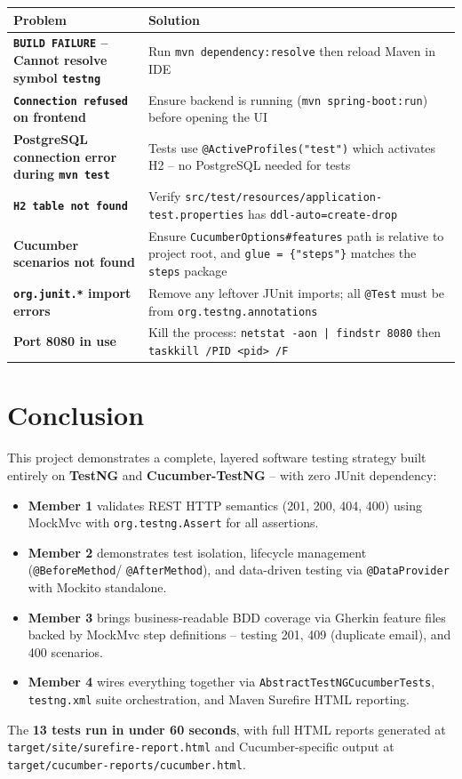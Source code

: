 \documentclass[12pt,a4paper]{article}
\begin{document}
\begin{tabularx}{\textwidth}{>{\bfseries}lX}
\toprule
Problem & Solution \\
\midrule
\texttt{BUILD FAILURE} -- Cannot resolve symbol \texttt{testng}
  & Run \texttt{mvn dependency:resolve} then reload Maven in IDE \\
\addlinespace
\texttt{Connection refused} on frontend
  & Ensure backend is running (\texttt{mvn spring-boot:run}) before opening the UI \\
\addlinespace
PostgreSQL connection error during \texttt{mvn test}
  & Tests use \texttt{@ActiveProfiles("test")} which activates H2 -- no PostgreSQL needed for tests \\
\addlinespace
\texttt{H2 table not found}
  & Verify \texttt{src/test/resources/application-test.properties} has \texttt{ddl-auto=create-drop} \\
\addlinespace
Cucumber scenarios not found
  & Ensure \texttt{CucumberOptions\#features} path is relative to project root,
    and \texttt{glue = \{"steps"\}} matches the \texttt{steps} package \\
\addlinespace
\texttt{org.junit.*} import errors
  & Remove any leftover JUnit imports; all \texttt{@Test} must be from \texttt{org.testng.annotations} \\
\addlinespace
Port 8080 in use
  & Kill the process: \texttt{netstat -aon | findstr 8080} then \texttt{taskkill /PID <pid> /F} \\
\bottomrule
\end{tabularx}

\section{Conclusion}

This project demonstrates a complete, layered software testing strategy built entirely
on \textbf{TestNG} and \textbf{Cucumber-TestNG} -- with zero JUnit dependency:

\begin{itemize}[noitemsep]
  \item \textbf{Member 1} validates REST HTTP semantics (201, 200, 404, 400) using MockMvc with
        \texttt{org.testng.Assert} for all assertions.
  \item \textbf{Member 2} demonstrates test isolation, lifecycle management (\texttt{@BeforeMethod}/
        \texttt{@AfterMethod}), and data-driven testing via \texttt{@DataProvider} with Mockito
        standalone.
  \item \textbf{Member 3} brings business-readable BDD coverage via Gherkin feature files backed
        by MockMvc step definitions -- testing 201, 409 (duplicate email), and 400 scenarios.
  \item \textbf{Member 4} wires everything together via \texttt{AbstractTestNGCucumberTests},
        \texttt{testng.xml} suite orchestration, and Maven Surefire HTML reporting.
\end{itemize}

The \textbf{13 tests run in under 60 seconds}, with full HTML reports generated at
\texttt{target/site/surefire-report.html} and Cucumber-specific output at
\texttt{target/cucumber-reports/cucumber.html}.
\end{document}
